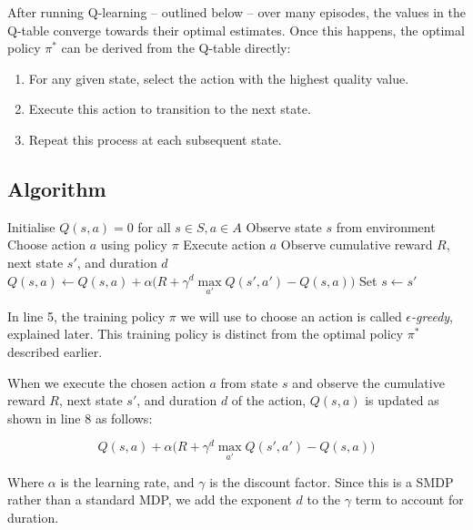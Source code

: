 \documentclass[a4paper]{report}
\begin{document}
After running Q-learning -- outlined below -- over many episodes, the values in the Q-table converge towards their optimal estimates. Once this happens, the optimal policy $\pi^*$ can be derived from the Q-table directly:

\begin{enumerate}
  \item For any given state, select the action with the highest quality value.
  \item Execute this action to transition to the next state.
  \item Repeat this process at each subsequent state.
\end{enumerate}

\subsection{Algorithm}

\begin{algorithm}[H]
  \caption{Tabular Q-Learning}
  \begin{algorithmic}[1]
  \State Initialise $Q(s,a) = 0$ for all $s \in S, a \in A$
      \State Observe state $s$ from environment
          \State Choose action $a$ using policy $\pi$
          \State Execute action $a$
          \State Observe cumulative reward $R$, next state $s'$, and duration $d$
          \State $Q(s,a) \leftarrow Q(s,a) + \alpha \Big(R + \gamma^d \underset{a'}{\max} Q(s',a') - Q(s,a)\Big)$
          \State Set $s \leftarrow s'$
      \EndFor
  \EndFor
  \end{algorithmic}
\end{algorithm}

In line 5, the training policy $\pi$ we will use to choose an action is called \emph{$\epsilon$-greedy}, explained later. This training policy is distinct from the optimal policy $\pi^*$ described earlier.

When we execute the chosen action $a$ from state $s$ and observe the cumulative reward $R$, next state $s'$, and duration $d$ of the action, $Q(s,a)$ is updated as shown in line 8 as follows:

\[
  Q(s,a) + \alpha \Big(R + \gamma^d \underset{a'}{\max} Q(s',a') - Q(s,a)\Big)
\]

Where $\alpha$ is the learning rate, and $\gamma$ is the discount factor. Since this is a SMDP rather than a standard MDP, we add the exponent $d$ to the $\gamma$ term to account for duration.
\end{document}
